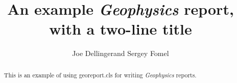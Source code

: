 \documentclass{georeport}
\begin{document}
\title{An example \emph{Geophysics} report, \\ with a two-line title}

\renewcommand{\thefootnote}{\fnsymbol{footnote}} 


\address{
\footnotemark[1]BP UTG, \\
200 Westlake Park Blvd, \\
Houston, TX, 77079 \\
\footnotemark[2]Bureau of Economic Geology, \\
John A. and Katherine G. Jackson School of Geosciences \\
The University of Texas at Austin \\
University Station, Box X \\
Austin, TX 78713-8924}
\author{Joe Dellinger\footnotemark[1] and Sergey Fomel\footnotemark[2]}


\maketitle

\begin{abstract}
  This is an example of using \textsf{georeport.cls} for writing
  \emph{Geophysics} reports.
\end{abstract}






\newpage


\end{document}
